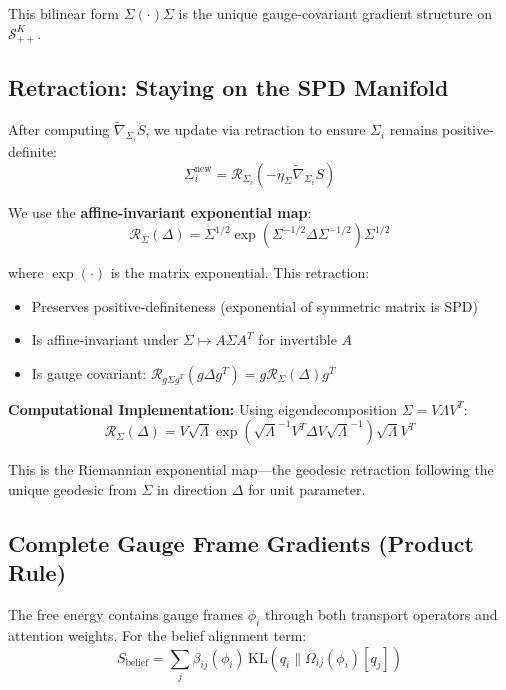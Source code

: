 \documentclass[11pt]{article}
\begin{document}
This bilinear form $\Sigma (\cdot) \Sigma$ is the unique gauge-covariant gradient structure on $\mathcal{S}_{++}^K$.

\subsection*{Retraction: Staying on the SPD Manifold}

After computing $\tilde{\nabla}_{\Sigma_i} S$, we update via retraction to ensure $\Sigma_i$ remains positive-definite:
\begin{equation}
\Sigma_i^{\mathrm{new}} = \mathcal{R}_{\Sigma_i}(-\eta_\Sigma \tilde{\nabla}_{\Sigma_i} S)
\end{equation}

We use the \textbf{affine-invariant exponential map}:
\begin{equation}
\mathcal{R}_{\Sigma}(\Delta) = \Sigma^{1/2} \exp\left(\Sigma^{-1/2} \Delta \Sigma^{-1/2}\right) \Sigma^{1/2}
\end{equation}

where $\exp(\cdot)$ is the matrix exponential. This retraction:
\begin{itemize}
\item Preserves positive-definiteness (exponential of symmetric matrix is SPD)
\item Is affine-invariant under $\Sigma \mapsto A\Sigma A^T$ for invertible $A$
\item Is gauge covariant: $\mathcal{R}_{g\Sigma g^T}(g\Delta g^T) = g \mathcal{R}_{\Sigma}(\Delta) g^T$
\end{itemize}

\textbf{Computational Implementation:} Using eigendecomposition $\Sigma = V\Lambda V^T$:
\begin{equation}
\mathcal{R}_{\Sigma}(\Delta) = V \sqrt{\Lambda} \exp\left(\sqrt{\Lambda}^{-1} V^T \Delta V \sqrt{\Lambda}^{-1}\right) \sqrt{\Lambda} V^T
\end{equation}

This is the Riemannian exponential map---the geodesic retraction following the unique geodesic from $\Sigma$ in direction $\Delta$ for unit parameter.

\subsection*{Complete Gauge Frame Gradients (Product Rule)}

The free energy contains gauge frames $\phi_i$ through both transport operators and attention weights. For the belief alignment term:
\begin{equation}
S_{\mathrm{belief}} = \sum_j \beta_{ij}(\phi_i) \, \mathrm{KL}(q_i \| \Omega_{ij}(\phi_i)[q_j])
\end{equation}
\end{document}
